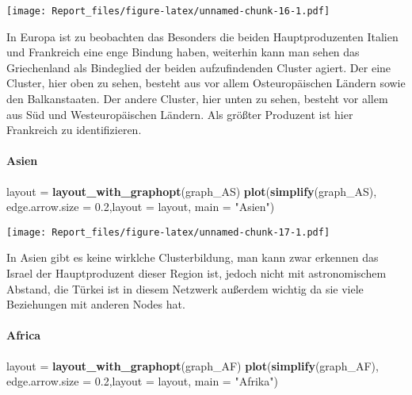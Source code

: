 \documentclass[
]{article}
\newenvironment{Shaded}{\begin{snugshade}}{\end{snugshade}}
\newcommand{\AttributeTok}[1]{\textcolor[rgb]{0.13,0.29,0.53}{#1}}
\newcommand{\FloatTok}[1]{\textcolor[rgb]{0.00,0.00,0.81}{#1}}
\newcommand{\FunctionTok}[1]{\textcolor[rgb]{0.13,0.29,0.53}{\textbf{#1}}}
\newcommand{\NormalTok}[1]{#1}
\newcommand{\OtherTok}[1]{\textcolor[rgb]{0.56,0.35,0.01}{#1}}
\newcommand{\StringTok}[1]{\textcolor[rgb]{0.31,0.60,0.02}{#1}}
\begin{document}
\texttt{[image: Report\_files/figure-latex/unnamed-chunk-16-1.pdf]}

In Europa ist zu beobachten das Besonders die beiden Hauptproduzenten
Italien und Frankreich eine enge Bindung haben, weiterhin kann man sehen
das Griechenland als Bindeglied der beiden aufzufindenden Cluster
agiert. Der eine Cluster, hier oben zu sehen, besteht aus vor allem
Osteuropäischen Ländern sowie den Balkanstaaten. Der andere Cluster,
hier unten zu sehen, besteht vor allem aus Süd und Westeuropäischen
Ländern. Als größter Produzent ist hier Frankreich zu identifizieren.

\paragraph{Asien}\label{asien}

\begin{Shaded}
\begin{Highlighting}[]
\NormalTok{layout }\OtherTok{=} \FunctionTok{layout\_with\_graphopt}\NormalTok{(graph\_AS)}
\FunctionTok{plot}\NormalTok{(}\FunctionTok{simplify}\NormalTok{(graph\_AS), }\AttributeTok{edge.arrow.size =} \FloatTok{0.2}\NormalTok{,}\AttributeTok{layout =}\NormalTok{ layout, }\AttributeTok{main =} \StringTok{"Asien"}\NormalTok{)}
\end{Highlighting}
\end{Shaded}

\texttt{[image: Report\_files/figure-latex/unnamed-chunk-17-1.pdf]}

In Asien gibt es keine wirklche Clusterbildung, man kann zwar erkennen
das Israel der Hauptproduzent dieser Region ist, jedoch nicht mit
astronomischem Abstand, die Türkei ist in diesem Netzwerk außerdem
wichtig da sie viele Beziehungen mit anderen Nodes hat.

\paragraph{Africa}\label{africa}

\begin{Shaded}
\begin{Highlighting}[]
\NormalTok{layout }\OtherTok{=} \FunctionTok{layout\_with\_graphopt}\NormalTok{(graph\_AF)}
\FunctionTok{plot}\NormalTok{(}\FunctionTok{simplify}\NormalTok{(graph\_AF), }\AttributeTok{edge.arrow.size =} \FloatTok{0.2}\NormalTok{,}\AttributeTok{layout =}\NormalTok{ layout, }\AttributeTok{main =} \StringTok{"Afrika"}\NormalTok{)}
\end{Highlighting}
\end{Shaded}
\end{document}
